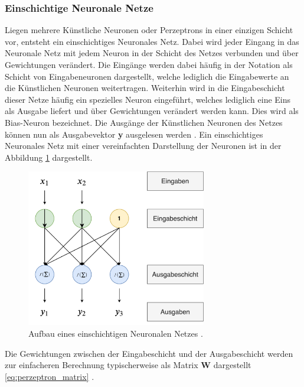 \documentclass[11pt,bibliography=totocnumbered]{scrartcl}
\begin{document}
\subsubsection{Einschichtige Neuronale Netze}
Liegen mehrere Künstliche Neuronen oder Perzeptrons in einer einzigen Schicht vor, entsteht ein einschichtiges Neuronales Netz. Dabei wird jeder Eingang in das Neuronale Netz mit jedem Neuron in der Schicht des Netzes verbunden und über Gewichtungen verändert. Die Eingänge werden dabei häufig in der Notation als Schicht von Eingabeneuronen dargestellt, welche lediglich die Eingabewerte an die Künstlichen Neuronen weitertragen. Weiterhin wird in die Eingabeschicht dieser Netze häufig ein spezielles Neuron eingeführt, welches lediglich eine Eins als Ausgabe liefert und über Gewichtungen verändert werden kann. Dies wird als Bias-Neuron bezeichnet. Die Ausgänge der Künstlichen Neuronen des Netzes können nun als Ausgabevektor \textbf{y} ausgelesen werden \cite[S.26]{BA}\cite[S.258]{MACHINE_LEARNING}. Ein einschichtiges Neuronales Netz mit einer vereinfachten Darstellung der Neuronen ist in der Abbildung \ref{fig:multi_neuron_perceptron} dargestellt.
\begin{figure}[H]
	\centering
	\includegraphics[width=0.7\textwidth]{multi_neuron_perceptron}
	\vspace*{-5mm}
	\caption[Einschichtiges Neuronales Netz]{Aufbau eines einschichtigen Neuronalen Netzes \cite[S.27]{BA}\cite[S.258]{MACHINE_LEARNING}.}
	\label{fig:multi_neuron_perceptron}
\end{figure}
\vspace*{-5mm}
Die Gewichtungen zwischen der Eingabeschicht und der Ausgabeschicht werden zur einfacheren Berechnung typischerweise als Matrix \textbf{W} dargestellt \eqref{eq:perzeptron_matrix} \cite[S.26]{BA}\cite[S.258]{MACHINE_LEARNING}.
\end{document}
